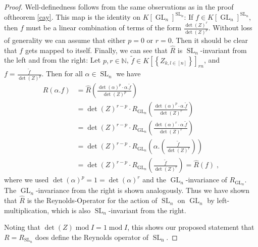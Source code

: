 \begin{proof}
  Well-definedness follows from the same observations as in the proof of\linebreak theorem \ref{cay}.
  This map is the identity on $ K \left\lbrack \operatorname{GL}_n \right\rbrack ^{\operatorname{SL}_n }$:
  If $f \in K[\operatorname{GL}_n]^{\operatorname{SL}_n}$, then $f$ must be a linear combination of terms of the form $\frac{\operatorname{det}(Z)^r}{\operatorname{det}(Z)^p}$.
  Without loss of \linebreak generality we can assume that either $p=0$ or $r=0$.
  Then it should be clear that $f$ gets mapped to itself.
  Finally, we can see that $\hat{R}$ is $\operatorname{SL}_n$-invariant from the left and from the right:
  Let $ p,r \in \mathbb{N} $, $ \tilde{f} \in K \left\lbrack \left\lbrace Z_{k,l \in [ n ]} \right\rbrace \right\rbrack_{rn} $, and $ f = \frac{\tilde{f}}{\operatorname{det} (Z)^p } $.
  Then for all $\alpha \in \operatorname{SL}_n$ we have
  \begin{equation*}
    \begin{aligned}
      \hat{R} (\alpha . f)
      &= \hat{R} \left( \frac{ \operatorname{det} (\alpha)^p \cdot \alpha . \tilde{f} }{ \operatorname{det} (Z)^p } \right)  \\
      &= \operatorname{det} (Z)^{r-p} \cdot R_{\operatorname{GL}_n} \left( \frac{ \operatorname{det} (\alpha)^p \cdot \alpha . \tilde{f} }{ \operatorname{det}(Z)^r } \right)  \\
      &= \operatorname{det} (Z)^{r-p} \cdot R_{\operatorname{GL}_n} \left( \frac{ \operatorname{det} (\alpha)^r \cdot \alpha . \tilde{f} }{ \operatorname{det}(Z)^r } \right)  \\
      &= \operatorname{det} (Z)^{r-p} \cdot R_{\operatorname{GL}_n} \left( \alpha . \left( \frac{ \tilde{f} }{ \operatorname{det} (Z)^r } \right) \right)  \\
      &= \operatorname{det} (Z)^{r-p} \cdot R_{\operatorname{GL}_n} \left( \frac{ \tilde{f} }{ \operatorname{det} (Z)^r } \right)
      = \hat{R} (f) \; ,
    \end{aligned}
  \end{equation*}
  where we used $ \operatorname{det} (\alpha)^p = 1 = \operatorname{det} (\alpha)^r $ and the $\operatorname{GL}_n$-invariance of $R_{\operatorname{GL}_n}$.
  The $\operatorname{GL}_n$-invariance from the right is shown analogously.
  Thus we have shown that $\hat{R}$ is the Reynolds-Operator for the action of $\operatorname{SL}_n$ on $\operatorname{GL}_n$ by left-multiplication, which is also $\operatorname{SL}_n$-invariant from the right.
  
  Noting that $ \operatorname{det} (Z) \operatorname{mod} I = 1 \operatorname{mod} I $, this shows our proposed statement that $ R = R_{\operatorname{SL}_n} $ does define the Reynolds operator of $\operatorname{\operatorname{SL}_n}$.
\end{proof}

